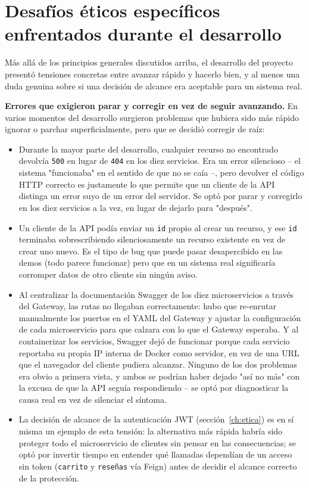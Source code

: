 \section{Desafíos éticos específicos enfrentados durante el desarrollo}

Más allá de los principios generales discutidos arriba, el desarrollo del proyecto
presentó tensiones concretas entre avanzar rápido y hacerlo bien, y al menos una duda
genuina sobre si una decisión de alcance era aceptable para un sistema real.

\textbf{Errores que exigieron parar y corregir en vez de seguir avanzando.} En varios
momentos del desarrollo surgieron problemas que hubiera sido más rápido ignorar o
parchar superficialmente, pero que se decidió corregir de raíz:

\begin{itemize}
    \item Durante la mayor parte del desarrollo, cualquier recurso no encontrado
    devolvía \texttt{500} en lugar de \texttt{404} en los diez servicios. Era un error
    silencioso -- el sistema "funcionaba" en el sentido de que no se caía --, pero
    devolver el código HTTP correcto es justamente lo que permite que un cliente de la
    API distinga un error suyo de un error del servidor. Se optó por parar y corregirlo
    en los diez servicios a la vez, en lugar de dejarlo para "después".
    \item Un cliente de la API podía enviar un \texttt{id} propio al crear un recurso, y
    ese \texttt{id} terminaba sobrescribiendo silenciosamente un recurso existente en
    vez de crear uno nuevo. Es el tipo de bug que puede pasar desapercibido en las
    demos (todo parece funcionar) pero que en un sistema real significaría corromper
    datos de otro cliente sin ningún aviso.
    \item Al centralizar la documentación Swagger de los diez microservicios a través
    del Gateway, las rutas no llegaban correctamente: hubo que re-enrutar manualmente
    los puertos en el YAML del Gateway y ajustar la configuración de cada
    microservicio para que calzara con lo que el Gateway esperaba. Y al containerizar
    los servicios, Swagger dejó de funcionar porque cada servicio reportaba su propia
    IP interna de Docker como servidor, en vez de una URL que el navegador del cliente
    pudiera alcanzar. Ninguno de los dos problemas era obvio a primera vista, y ambos
    se podrían haber dejado "así no más" con la excusa de que la API seguía
    respondiendo -- se optó por diagnosticar la causa real en vez de silenciar el
    síntoma.
    \item La decisión de alcance de la autenticación JWT (sección~\ref{ch:etica}) es en
    sí misma un ejemplo de esta tensión: la alternativa más rápida habría sido proteger
    todo el microservicio de clientes sin pensar en las consecuencias; se optó por
    invertir tiempo en entender qué llamadas dependían de un acceso sin token
    (\texttt{carrito} y \texttt{reseñas} vía Feign) antes de decidir el alcance
    correcto de la protección.
\end{itemize}

